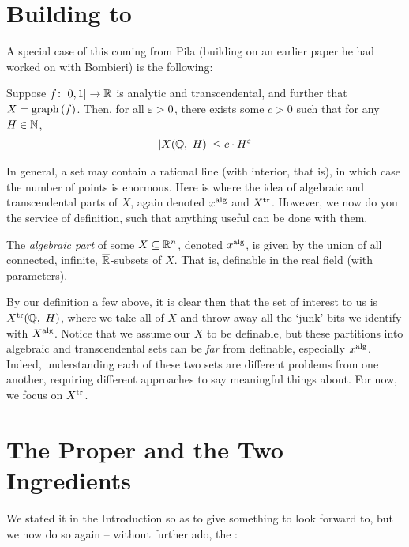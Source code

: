 \section{Building to \pw}

A special case of this coming from Pila (building on an earlier paper he had worked on with Bombieri) is the following:

\begin{theorem}
  Suppose $\funcdom{f}{[0, 1]}{\R}$ is analytic and transcendental, and further that $X = \graph{f}$. Then, for all $\eps > 0$, there exists some $c > 0$ such that for any $H \in \N$,
    \begin{align*}
      \card{\XQH[H]} \leq c \cdot H^{\eps}
    \end{align*}
\end{theorem}

In general, a  set may contain a rational line (with interior, that is), in which case the number of points is enormous. Here is where the idea of algebraic and transcendental parts of $X$, again denoted $\Xalg[x]$ and $\Xtr[X]$. However, we now do you the service of definition, such that anything useful can be done with them.

\begin{definition}
  The \emph{algebraic part} of some $\XRn[X]{n}$, denoted $\Xalg[x]$, is given by the union of all connected, infinite, $\overline{\R}$- subsets of $X$. That is, definable in the real field (with parameters).
\end{definition}

By our definition a few above, it is clear then that the set of interest to us is $\XtrQH[H]$, where we take all of $X$ and throw away all the `junk' bits we identify with $\Xalg[X]$. Notice that we assume our $X$ to be definable, but these partitions into algebraic and transcendental sets can be \emph{far} from definable, especially $\Xalg[x]$. Indeed, understanding each of these two sets are different problems from one another, requiring different approaches to say meaningful things about. For now, we focus on $\Xtr[X]$.

\section{The \pwt Proper and the Two Ingredients}

We stated it in the Introduction so as to give something to look forward to, but we now do so again -- without further ado, the \pwt:

